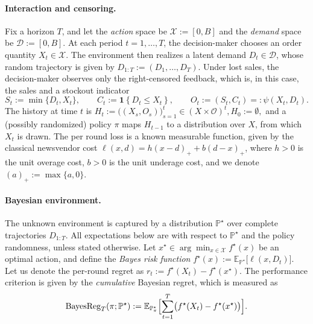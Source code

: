 \documentclass[11pt]{article}
\DeclarePairedDelimiter{\ind}{\mathbf{1}\{}{\}}
\renewcommand{\P}{\mathbb{P}}
\providecommand{\E}{\mathbb{E}}
\providecommand{\ind}[1]{\mathbf{1}\!\left\{#1\right\}}
\providecommand{\BReg}{\mathrm{BayesReg}}
\providecommand{\cX}{\mathcal{X}}
\begin{document}
\paragraph{Interaction and censoring.}
Fix a horizon $T$, and let the \emph{action} space be $\mathcal{X}:=[0,B]$ and the \emph{demand} space be $\mathcal{D}:=[0,B]$. At each period $t=1,\dots,T$, the decision-maker chooses an order quantity $X_t \in \mathcal X$. The environment then realizes a latent demand $D_t \in \mathcal D$, whose random trajectory is given by $D_{1:T} := (D_1,\dots,D_T)$. Under lost sales, the decision-maker observes only the right-censored feedback, which is, in this case, the sales and a stockout indicator
\[
S_t := \min\{D_t, X_t\},
\qquad
C_t := \ind{D_t \le X_t},
\qquad
O_t := (S_t, C_t) =: \psi(X_t, D_t).
\]
The history at time $t$ is \( H_t := \bigl( (X_s, O_s) \bigr)_{s=1}^t \in (X \times \mathcal{O})^t, H_0 := \emptyset, \)
and a (possibly randomized) policy $\pi$ maps $H_{t-1}$ to a distribution over $X$, from which $X_t$ is drawn. The per round loss is a known measurable function, given by the classical newsvendor cost $\ell(x,d)=h(x-d)_+ + b(d-x)_+$, where $h > 0$ is the unit overage cost, $b > 0$ is the unit underage cost, and we denote $(a)_+ := \max\{a, 0\}$.






\paragraph{Bayesian environment.}
The unknown environment is captured by a distribution $\P^\star$ over complete trajectories $D_{1:T}$.
All expectations below are with respect to $\P^\star$ and the policy randomness, unless stated otherwise. Let $x^\star \in \arg\min_{x\in\cX} f^\star(x)$ be an optimal action, and define the \emph{Bayes risk function} \( f^\star(x) := \E_{\P^\star}\bigl[\ell(x,D_t)\bigr]\). Let us denote the per-round regret as $r_t := f^\star(X_t) - f^\star(x^\star)$. The performance criterion is given by the \emph{cumulative} Bayesian regret, which is measured as
\[
\BReg_T(\pi;\P^\star) := \E_{\P^\star_\pi}\Bigl[\sum_{t=1}^T \bigl(f^\star(X_t)-f^\star(x^\star)\bigr)\Bigr].
\]
\end{document}
